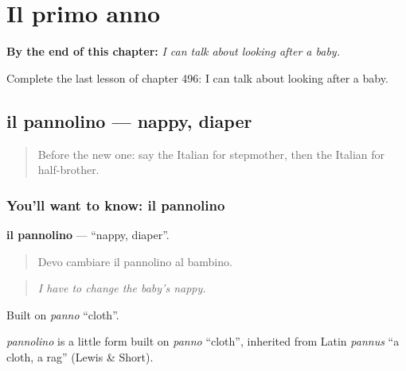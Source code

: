 
\chapter{Il primo anno}
\label{ch:it-il-primo-anno}

\begin{chapteropening}
\textbf{By the end of this chapter:} \emph{I can talk about looking after a baby.}

Complete the last lesson of chapter 496: I can talk about looking after a baby.
\end{chapteropening}

\section[il pannolino]{il pannolino — nappy, diaper}

\label{lesson:IT-C496-pannolino}



\begin{quote}
Before the new one: say the Italian for stepmother, then the Italian for half-brother.
\end{quote}

\subsection*{You'll want to know: il pannolino}
\textbf{il pannolino} — \textquotedblleft{}nappy, diaper\textquotedblright{}.

\begin{quote}
Devo cambiare il pannolino al bambino.
\end{quote}

\begin{quote}
\emph{I have to change the baby's nappy.}
\end{quote}

Built on \emph{panno} \textquotedblleft{}cloth\textquotedblright{}.

\begin{cousinweb}
\emph{pannolino} is a little form built on \emph{panno} \textquotedblleft{}cloth\textquotedblright{}, inherited from Latin \emph{pannus} \textquotedblleft{}a cloth, a rag\textquotedblright{} (Lewis \& Short).
\end{cousinweb}

